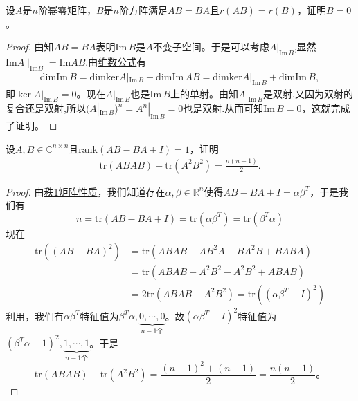 \documentclass[../../main.tex]{subfiles}%
\begin{document}
\begin{example}
设\( A \)是\( n \)阶幂零矩阵，\( B \)是\( n \)阶方阵满足\( AB = BA \)且\( r(AB) = r(B) \)，证明\( B = 0 \)。
\end{example}
\begin{proof}

由知\( AB = BA \)表明\( \text{Im}\, B \)是\( A \)不变子空间。于是可以考虑\( A|_{\text{Im}\, B} \),显然$\mathrm{Im} A\mid_{\mathrm{Im} B}=\mathrm{Im} AB$.由\hyperref[theorem:交和空间维数公式]{维数公式}有
\begin{align*}
\mathrm{dimIm}\,B=\mathrm{dimker}A|_{\mathrm{Im}\,B}+\mathrm{dimIm}\,AB=\mathrm{dimker}A|_{\mathrm{Im}\,B}+\mathrm{dimIm}\,B,
\end{align*}
即\( \ker A|_{\text{Im}\, B} = 0 \)。现在\( A|_{\text{Im}\, B} \)也是\( \text{Im}\, B \)上的单射。由知\( A|_{\text{Im}\, B} \)是双射.又因为双射的复合还是双射,所以\( (A|_{\text{Im}\, B})^n = A^n|_{\text{Im}\, B} = 0 \)也是双射.从而可知\( \text{Im}\, B = 0 \)，这就完成了证明。

\end{proof}

\begin{example}
设\( A,B \in \mathbb{C}^{n \times n} \)且\( \text{rank}(AB - BA + I) = 1 \)，证明
\begin{align}
\text{tr}(ABAB) - \text{tr}(A^2B^2) = \frac{n(n - 1)}{2}. \label{EQ:::-48972489-----12-1--23.116}
\end{align}
\end{example}
\begin{proof}

由\hyperref[lemma:秩1矩阵的列向量分解]{秩1矩阵性质}，我们知道存在\( \alpha,\beta \in \mathbb{R}^n \)使得\( AB - BA + I = \alpha\beta^T \)，于是我们有
\[
n = \text{tr}(AB - BA + I) = \text{tr}(\alpha\beta^T) = \text{tr}(\beta^T\alpha)
\]
现在
\[
\begin{aligned}
\text{tr}\left((AB - BA)^2\right) &= \text{tr}(ABAB - AB^2A - BA^2B + BABA) \\
&= \text{tr}(ABAB - A^2B^2 - A^2B^2 + ABAB) \\
&= 2\text{tr}(ABAB - A^2B^2) = \text{tr}\left((\alpha\beta^T - I)^2\right)
\end{aligned}
\]
利用，我们有\( \alpha\beta^T \)特征值为\( \beta^T\alpha,\underbrace{0,\cdots,0}_{n-1个} \)。故\( (\alpha\beta^T - I)^2 \)特征值为\( (\beta^T\alpha - 1)^2,\underbrace{1,\cdots,1}_{n-1个} \)。于是
\[
\text{tr}(ABAB) - \text{tr}(A^2B^2) = \frac{(n - 1)^2 + (n - 1)}{2} = \frac{n(n - 1)}{2}。
\]

\end{proof}
\end{document}
